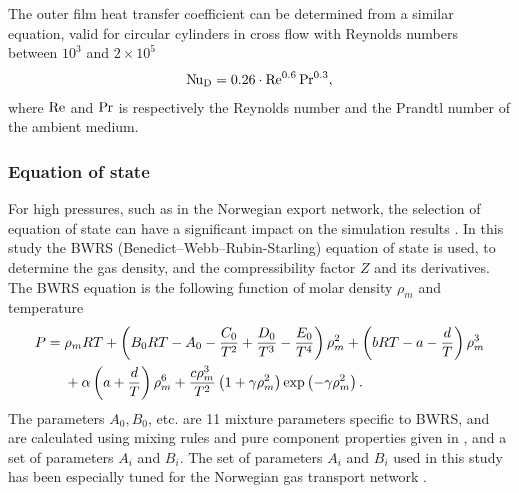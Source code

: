 The outer film heat transfer coefficient can be determined from a similar equation, valid for circular cylinders in cross flow with Reynolds numbers between $10^3$ and $2\times 10^5$ \cite{Bergman2011Fundamentals}%
\begin{align}
    \operatorname{N\kern-.09em u}_\mathrm{D} = 0.26\cdot\operatorname{R\kern-.04em e}^{0.6}\operatorname{P\kern-.03em r}^{0.3}
, \label{eq:outerFilm}
\end{align}
where $\operatorname{R\kern-.04em e}$ and $\operatorname{P\kern-.03em r}$ is respectively the Reynolds number and the Prandtl number of the ambient medium.

\subsubsection{Equation of state}
For high pressures, such as in the Norwegian export network, the selection of equation of state can have a significant impact on the simulation results \cite{Helgaker2014Validation,Chaczykowski2009Sensitivity}. In this study the BWRS (Benedict–Webb–Rubin-Starling) equation of state \cite{Starling1973Fluid} is used, to determine the gas density, and the compressibility factor $Z$ and its derivatives. The BWRS equation is the following function of molar density $\rho_m$ and temperature
\begin{align}
\begin{split}
    P ={} &\rho_m RT 
    + \del{B_0 RT - A_0 - \frac{C_0}{T^2} + \frac{D_0}{T^3} - \frac{E_0}{T^4}}\rho_m^2 
    + \del{bRT - a - \frac{d}{T}}\rho_m^3 
    \\&
    + \alpha \del{a + \frac{d}{T}}\rho_m^6 
    + \frac{c\rho_m^3}{T^2}\del{1 + \gamma \rho_m^2} \exp\del{-\gamma \rho_m^2}
.
\end{split}
\end{align}
The parameters $A_0, B_0$, etc. are 11 mixture parameters specific to BWRS, and are calculated using mixing rules and pure component properties given in \cite{Starling1973Fluid}, and a set of parameters $A_i$ and $B_i$. %
The set of parameters $A_i$ and $B_i$ used in this study has been especially tuned for the Norwegian gas transport network \cite{Calsep}.

